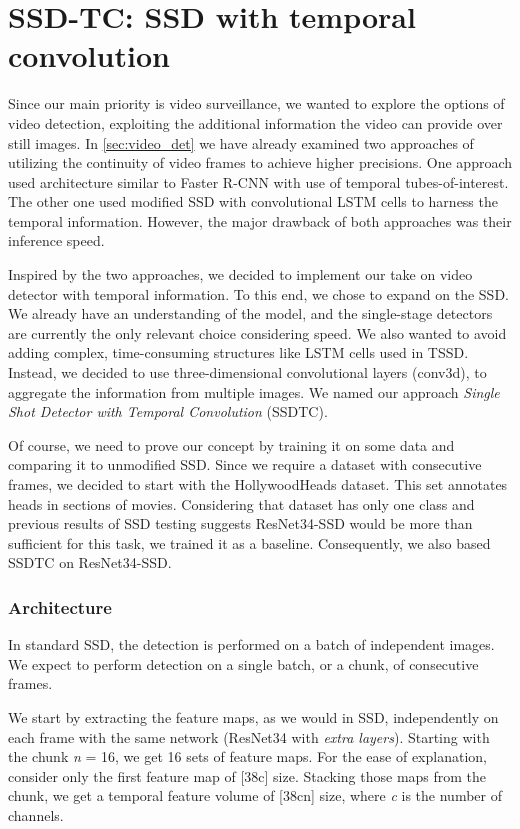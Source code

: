 \section{SSD-TC: SSD with temporal convolution}
\label{sec:ssdtc}
Since our main priority is video surveillance, we wanted to explore the options of video detection, exploiting the additional information the video can provide over still images. In \cref{sec:video_det} we have already examined two approaches of utilizing the continuity of video frames to achieve higher precisions. One approach used architecture similar to Faster R-CNN with use of temporal tubes-of-interest. The other one used modified SSD with convolutional LSTM cells to harness the temporal information. However, the major drawback of both approaches was their inference speed. 

Inspired by the two approaches, we decided to implement our take on video detector with temporal information. To this end, we chose to expand on the SSD. We already have an understanding of the model, and the single-stage detectors are currently the only relevant choice considering speed. We also wanted to avoid adding complex, time-consuming structures like LSTM cells used in TSSD. Instead, we decided to use three-dimensional convolutional layers (conv3d), to aggregate the information from multiple images. We named our approach \textit{Single Shot Detector with Temporal Convolution} (SSDTC).

Of course, we need to prove our concept by training it on some data and comparing it to unmodified SSD. Since we require a dataset with consecutive frames, we decided to start with the HollywoodHeads dataset. This set annotates heads in sections of movies. Considering that dataset has only one class and previous results of SSD testing suggests ResNet34-SSD would be more than sufficient for this task, we trained it as a baseline. Consequently, we also based SSDTC on ResNet34-SSD.

\subsubsection{Architecture}
In standard SSD, the detection is performed on a batch of independent images. We expect to perform detection on a single batch, or a chunk, of consecutive frames. 

We start by extracting the feature maps, as we would in SSD, independently on each frame with the same network (ResNet34 with \textit{extra layers}). Starting with the chunk \textit{n} = 16, we get 16 sets of feature maps. For the ease of explanation, consider only the first feature map of [38\x c] size. Stacking those maps from the chunk, we get a temporal feature volume of [38\x c\x n] size, where \textit{c} is the number of channels. 

